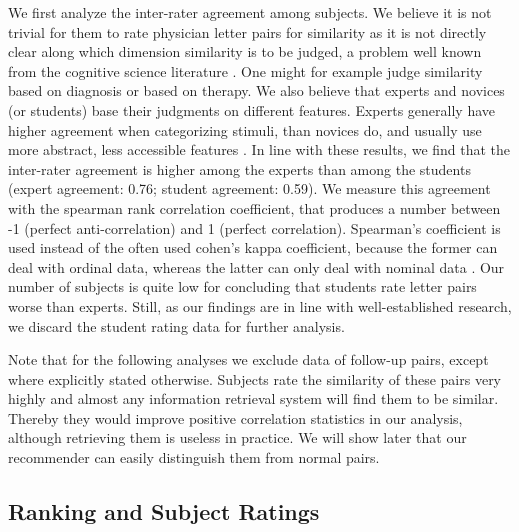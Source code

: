 We first analyze the inter-rater agreement among subjects. We believe it is not trivial for them to rate physician letter pairs for similarity as it is not directly clear along which dimension similarity is to be judged, a problem well known from the cognitive science literature \citep{Medin1993}. One might for example judge similarity based on diagnosis or based on therapy. We also believe that experts and novices (or students) base their judgments on different features. Experts generally have higher agreement when categorizing stimuli, than novices do, and usually use more abstract, less accessible features \citep{Chi1981, Linhares2007, Leon-Villagra2013}. In line with these results, we find that the inter-rater agreement is higher among the experts than among the students (expert agreement: 0.76; student agreement: 0.59). We measure this agreement with the spearman rank correlation coefficient, that produces a number between -1 (perfect anti-correlation) and 1 (perfect correlation). Spearman's coefficient is used instead of the often used cohen's kappa coefficient, because the former can deal with ordinal data, whereas the latter can only deal with nominal data \citep{Spearman1904, Cohen1960}. Our number of subjects is quite low for concluding that students rate letter pairs worse than experts. Still, as our findings are in line with well-established research, we discard the student rating data for further analysis. 

Note that for the following analyses we exclude data of follow-up pairs, except where explicitly stated otherwise. Subjects rate the similarity of these pairs very highly and almost any information retrieval system will find them to be similar. Thereby they would improve positive correlation statistics in our analysis, although retrieving them is useless in practice. We will show later that our recommender can easily distinguish them from normal pairs.

\subsection*{Ranking and Subject Ratings}

